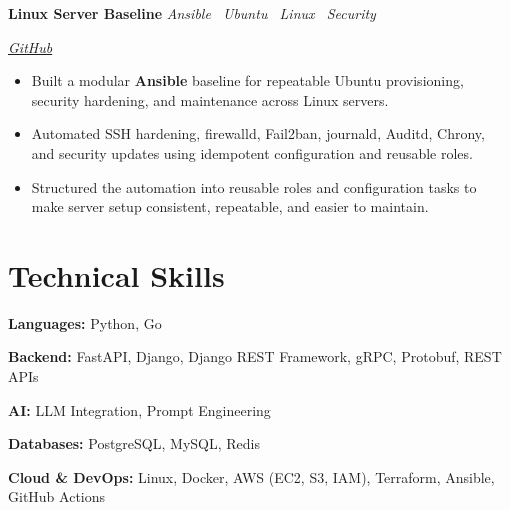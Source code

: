 \documentclass[10pt,a4paper]{article}
\newcommand{\projectentry}[3]{%
    \noindent
    \begin{minipage}[t]{0.62\linewidth}
        \raggedright
        \textbf{#1}
        \hspace{0.7em}
        \textit{\color{textgray}#2}
    \end{minipage}%
    \hfill
    \begin{minipage}[t]{0.34\linewidth}
        \raggedleft
        \itshape\color{textgray}#3
    \end{minipage}%
    \par
}
\begin{document}
\vspace{3pt}

\projectentry
    {Linux Server Baseline}
    {Ansible \textperiodcentered\ Ubuntu \textperiodcentered\ Linux \textperiodcentered\ Security}
    {\href{https://github.com/kishan-thanki/linux-server-baseline}{GitHub}}

\vspace{2pt}

\begin{itemize}
    \item Built a modular \textbf{Ansible} baseline for repeatable Ubuntu provisioning, security hardening, and maintenance across Linux servers.

    \item Automated SSH hardening, firewalld, Fail2ban, journald, Auditd, Chrony, and security updates using idempotent configuration and reusable roles.

    \item Structured the automation into reusable roles and configuration tasks to make server setup consistent, repeatable, and easier to maintain.
\end{itemize}

\section*{Technical Skills}

{\fontsize{9.7}{11.2}\selectfont

\textbf{Languages:} Python, Go
\par
\textbf{Backend:} FastAPI, Django, Django REST Framework, gRPC, Protobuf, REST APIs
\par
\textbf{AI:} LLM Integration, Prompt Engineering
\par
\textbf{Databases:} PostgreSQL, MySQL, Redis
\par
\textbf{Cloud \& DevOps:} Linux, Docker, AWS (EC2, S3, IAM), Terraform, Ansible, GitHub Actions
\par

}
\end{document}

